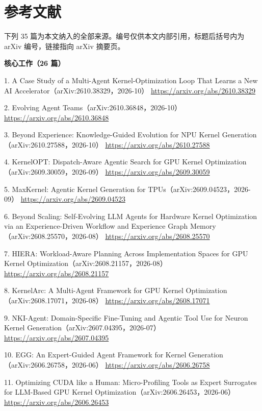 \section{参考文献}
\begin{refs}

下列 35 篇为本文纳入的全部来源。编号仅供本文内部引用，标题后括号内为 arXiv 编号，链接指向 arXiv 摘要页。

\textbf{核心工作（26 篇）}

1. A Case Study of a Multi-Agent Kernel-Optimization Loop That Learns a New AI Accelerator（arXiv:2610.38329，2026-10）  
   \url{https://arxiv.org/abs/2610.38329}

2. Evolving Agent Teams（arXiv:2610.36848，2026-10）  
   \url{https://arxiv.org/abs/2610.36848}

3. Beyond Experience: Knowledge-Guided Evolution for NPU Kernel Generation（arXiv:2610.27588，2026-10）  
   \url{https://arxiv.org/abs/2610.27588}

4. KernelOPT: Dispatch-Aware Agentic Search for GPU Kernel Optimization（arXiv:2609.30059，2026-09）  
   \url{https://arxiv.org/abs/2609.30059}

5. MaxKernel: Agentic Kernel Generation for TPUs（arXiv:2609.04523，2026-09）  
   \url{https://arxiv.org/abs/2609.04523}

6. Beyond Scaling: Self-Evolving LLM Agents for Hardware Kernel Optimization via an Experience-Driven Workflow and Experience Graph Memory（arXiv:2608.25570，2026-08）  
   \url{https://arxiv.org/abs/2608.25570}

7. HIERA: Workload-Aware Planning Across Implementation Spaces for GPU Kernel Optimization（arXiv:2608.21157，2026-08）  
   \url{https://arxiv.org/abs/2608.21157}

8. KernelArc: A Multi-Agent Framework for GPU Kernel Optimization（arXiv:2608.17071，2026-08）  
   \url{https://arxiv.org/abs/2608.17071}

9. NKI-Agent: Domain-Specific Fine-Tuning and Agentic Tool Use for Neuron Kernel Generation（arXiv:2607.04395，2026-07）  
   \url{https://arxiv.org/abs/2607.04395}

10. EGG: An Expert-Guided Agent Framework for Kernel Generation（arXiv:2606.26758，2026-06）  
   \url{https://arxiv.org/abs/2606.26758}

11. Optimizing CUDA like a Human: Micro-Profiling Tools as Expert Surrogates for LLM-Based GPU Kernel Optimization（arXiv:2606.26453，2026-06）  
   \url{https://arxiv.org/abs/2606.26453}


\end{refs}
